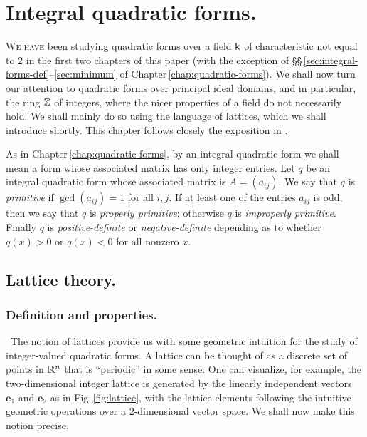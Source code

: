 \chapter{Integral quadratic forms.}
\label{chap:integral-quadratic-forms}

{\scshape We have} been studying quadratic forms over a field \(\mathsf{k}\) of
characteristic not equal to \(2\) in the first two chapters of this paper (with
the exception of \S\S\,\ref{sec:integral-forms-def}--\ref{sec:minimum} of
Chapter\,\ref{chap:quadratic-forms}). We shall now turn our attention to
quadratic forms over principal ideal domains, and in particular, the ring
\(\mathbb{Z}\) of integers, where the nicer properties of a field do not
necessarily hold. We shall mainly do so using the language of lattices, which we
shall introduce shortly. This chapter follows closely the exposition in
\cite{cassels2008rational}.

As in Chapter\,\ref{chap:quadratic-forms}, by an integral quadratic form we
shall mean a form whose associated matrix has only integer entries. Let \(q\) be
an integral quadratic form whose associated matrix is \(A = (a_{ij})\). We say
that \(q\) is \emph{primitive} if \(\gcd(a_{ij}) = 1\) for all \(i, j\). If at
least one of the entries \(a_{ij}\) is odd, then we say that \(q\) is
\emph{properly primitive}; otherwise \(q\) is \emph{improperly primitive}.
Finally \(q\) is \emph{positive-definite} or \emph{negative-definite} depending
as to whether \(q(x) > 0\) or \(q(x) < 0\) for all nonzero \(x\).

\section{Lattice theory.}

\subsection{Definition and properties.}~The notion of lattices provide us with
some geometric intuition for the study of integer-valued quadratic forms. A
lattice can be thought of as a discrete set of points in \(\mathbb{R}^n\) that is
``periodic'' in some sense. One can visualize, for example, the two-dimensional
integer lattice is generated by the linearly independent vectors
\(\mathbf{e}_1\) and \(\mathbf{e}_2\) as in Fig.\,\ref{fig:lattice}, with the
lattice elements following the intuitive geometric operations over a
\(2\)-dimensional vector space. We shall now make this notion
precise.\label{sec:lattice-def}

